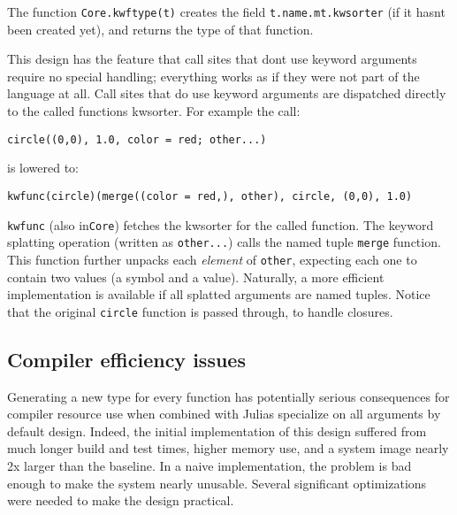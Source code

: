 The function \texttt{Core.kwftype(t)} creates the field \texttt{t.name.mt.kwsorter} (if it hasn{\textquotesingle}t been created yet), and returns the type of that function.



This design has the feature that call sites that don{\textquotesingle}t use keyword arguments require no special handling; everything works as if they were not part of the language at all. Call sites that do use keyword arguments are dispatched directly to the called function{\textquotesingle}s kwsorter. For example the call:




\begin{verbatim}
circle((0,0), 1.0, color = red; other...)
\end{verbatim}



is lowered to:




\begin{verbatim}
kwfunc(circle)(merge((color = red,), other), circle, (0,0), 1.0)
\end{verbatim}



\texttt{kwfunc} (also in\texttt{Core}) fetches the kwsorter for the called function. The keyword splatting operation (written as \texttt{other...}) calls the named tuple \texttt{merge} function. This function further unpacks each \emph{element} of \texttt{other}, expecting each one to contain two values (a symbol and a value). Naturally, a more efficient implementation is available if all splatted arguments are named tuples. Notice that the original \texttt{circle} function is passed through, to handle closures.



\hypertarget{1871194914272945034}{}


\subsection{Compiler efficiency issues}



Generating a new type for every function has potentially serious consequences for compiler resource use when combined with Julia{\textquotesingle}s {\textquotedbl}specialize on all arguments by default{\textquotedbl} design. Indeed, the initial implementation of this design suffered from much longer build and test times, higher memory use, and a system image nearly 2x larger than the baseline. In a naive implementation, the problem is bad enough to make the system nearly unusable. Several significant optimizations were needed to make the design practical.



